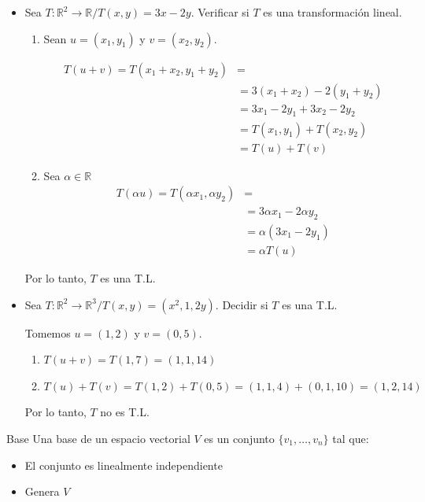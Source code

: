 \begin{itemize}
    \item Sea $T: \mathbb{R}^2 \to \mathbb{R} / T(x,y) = 3x-2y$. Verificar si
        $T$ es una transformación lineal.

        \begin{enumerate}
            \item Sean $u = (x_1, y_1)$ y $v = (x_2, y_2)$.

                \begin{align*}
                    T(u+v) = T(x_1 + x_2, y_1 + y_2) &= \\
                    &= 3(x_1 + x_2) - 2 (y_1 + y_2) \\
                    &= 3 x_1 - 2 y_1 + 3x_2 - 2 y_2 \\
                    &= T(x_1, y_1) + T(x_2, y_2) \\
                    &= T(u) + T(v)
                \end{align*}

            \item Sea $\alpha \in \mathbb{R}$
                \begin{align*}
                    T(\alpha u) = T(\alpha x_1, \alpha y_2) &= \\
                    &= 3 \alpha x_1 - 2 \alpha y_2 \\
                    &= \alpha (3x_1 - 2y_1) \\
                    &= \alpha T(u)
                \end{align*}
        \end{enumerate}

        Por lo tanto, $T$ es una T.L.

    \item Sea $T: \mathbb{R}^2 \to \mathbb{R}^3 / T(x,y) = (x^2,1,2y)$.
        Decidir si $T$ es una T.L.

        Tomemos $u = (1,2)$ y $v=(0,5)$.

        \begin{enumerate}
            \item $T(u+v) = T(1,7) = (1,1,14)$
            \item $T(u)+ T(v) = T(1,2) + T(0,5) = (1,1,4)+(0,1,10)=(1,2,14)$
        \end{enumerate}

        Por lo tanto, $T$ no es T.L.
\end{itemize}

\begin{definicion}{Base}{}
    Una base de un espacio vectorial $V$ es un conjunto 
    $\{ v_1, \dotsc, v_n \}$ 
    tal que:
    \begin{itemize}
        \item El conjunto es linealmente independiente
        \item Genera $V$
    \end{itemize}
\end{definicion}

